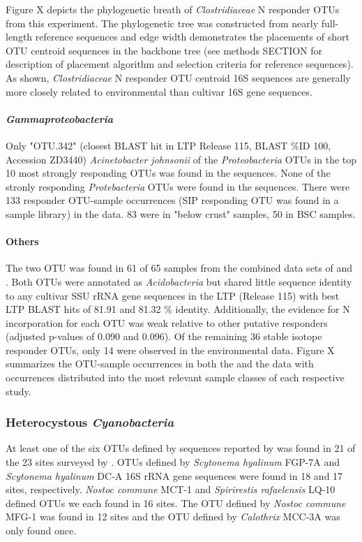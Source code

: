 Figure X depicts the phylogenetic breath of \textit{Clostridiaceae} N responder OTUs from this experiment. The phylogenetic tree was constructed from nearly full-length reference sequences and edge width demonstrates the placements of short OTU centroid sequences in the backbone tree (see methods SECTION for description of placement algorithm and selection criteria for reference sequences). As shown, \textit{Clostridiaceae} N responder OTU centroid 16S sequences are generally more closely related to environmental than cultivar 16S gene sequences.   

\paragraph{\textit{Gammaproteobacteria}}
Only "OTU.342" (closest BLAST hit in LTP Release 115, BLAST \%ID 100, Accession ZD3440) \textit{Acinetobacter johnsonii} of the \textit{Proteobacteria} OTUs in the top 10 most strongly responding OTUs was found in the \citet{Garcia_Pichel_2013} sequences. None of the stronly responding \textit{Protebacteria} OTUs were found in the \citet{Steven_2013} sequences. There were 133 responder OTU-sample occurrences (SIP responding OTU was found in a sample library) in the \citet{Steven_2013} data. 83 were in "below crust" samples, 50 in BSC samples.
\paragraph{Others} 
The two OTU was found in 61 of 65 samples from the combined data sets of \citet{Garcia_Pichel_2013} and \citet{Steven_2013}. Both OTUs were annotated as \textit{Acidobacteria} but shared little sequence identity to any cultivar SSU rRNA gene sequences in the LTP (Release 115) with best LTP BLAST hits of 81.91 and 81.32 \% identity. Additionally, the evidence for N incorporation for each OTU was weak relative to other putative responders (adjusted p-values of 0.090 and 0.096). Of the remaining 36 stable isotope responder OTUs, only 14 were observed in the environmental data. Figure X summarizes the OTU-sample occurrences in both the \citet{Steven_2013} and the \citet{Garcia_Pichel_2013} data with occurrences distributed into the most relevant sample classes of each respective study.

\subsubsection{Heterocystous \textit{Cyanobacteria}}
At least one of the six OTUs defined by sequences reported by \citet{Yeager} was found in 21 of the 23 sites surveyed by \citet{Garcia_Pichel_2013}. OTUs defined by \textit{Scytonema hyalinum} FGP-7A and \textit{Scytonema hyalinum} DC-A 16S rRNA gene sequences were found in 18 and 17 sites, respectively. \textit{Nostoc commune} MCT-1 and \textit{Spirirestis rafaelensis} LQ-10 defined OTUs we each found in 16 sites. The OTU defined by \textit{Nostoc commune} MFG-1 was found in 12 sites and the OTU defined by \textit{Calothrix} MCC-3A was only found once.
